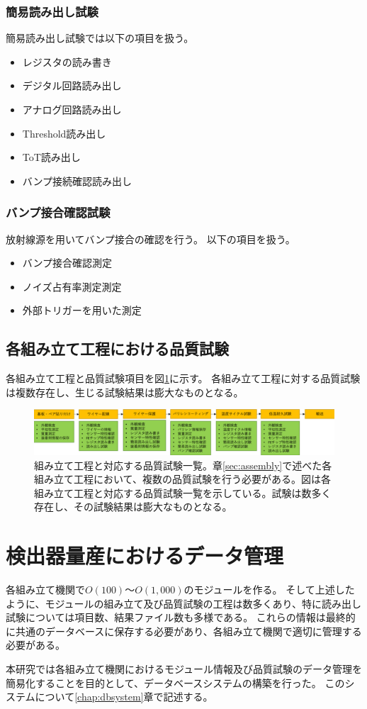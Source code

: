 \subsubsection{簡易読み出し試験}
簡易読み出し試験では以下の項目を扱う。
\begin{itemize}
  \item レジスタの読み書き
  \item デジタル回路読み出し
  \item アナログ回路読み出し
  \item Threshold読み出し
  \item ToT読み出し
  \item バンプ接続確認読み出し
\end{itemize}

\subsubsection{バンプ接合確認試験}
放射線源を用いてバンプ接合の確認を行う。
以下の項目を扱う。
\begin{itemize}
  \item バンプ接合確認測定
  \item ノイズ占有率測定測定
  \item 外部トリガーを用いた測定
\end{itemize}

\subsection{各組み立て工程における品質試験}

各組み立て工程と品質試験項目を図\ref{stage_test_flow}に示す。
各組み立て工程に対する品質試験は複数存在し、生じる試験結果は膨大なものとなる。

\begin{figure}[bpt]\centering
\includegraphics[width=15cm]{stage_test_flow}
\caption[組み立て工程と対応する品質試験一覧]{組み立て工程と対応する品質試験一覧。章\ref{sec:assembly}で述べた各組み立て工程において、複数の品質試験を行う必要がある。図は各組み立て工程と対応する品質試験一覧を示している。試験は数多く存在し、その試験結果は膨大なものとなる。}
\label{stage_test_flow}
\end{figure}

\section{検出器量産におけるデータ管理}
各組み立て機関で$O(100)〜O(1,000)$のモジュールを作る。
そして上述したように、モジュールの組み立て及び品質試験の工程は数多くあり、特に読み出し試験については項目数、結果ファイル数も多様である。
これらの情報は最終的に共通のデータベースに保存する必要があり、各組み立て機関で適切に管理する必要がある。

本研究では各組み立て機関におけるモジュール情報及び品質試験のデータ管理を簡易化することを目的として、データベースシステムの構築を行った。
このシステムについて\ref{chap:dbsystem}章で記述する。

